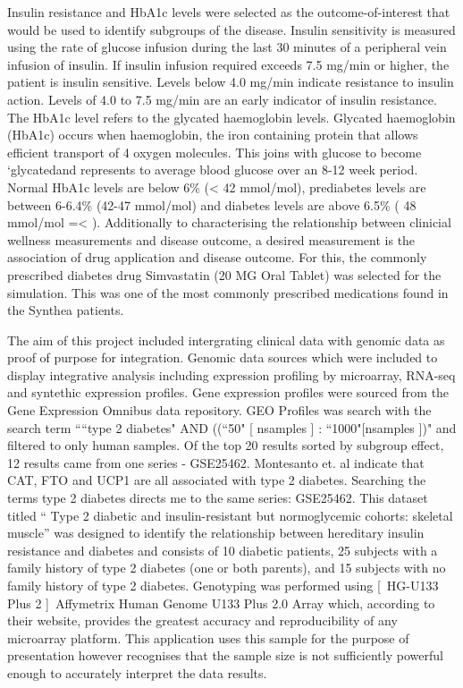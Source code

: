 \documentclass{bioinfo}
\begin{document}
\begin{methods}
Insulin resistance and HbA1c levels were selected as the outcome-of-interest that would be used to identify subgroups of the disease. Insulin sensitivity is measured using the rate of glucose infusion during the last 30 minutes of a peripheral vein infusion of insulin. If insulin infusion required exceeds 7.5 mg/min or higher, the patient is insulin sensitive. Levels below 4.0 mg/min indicate resistance to insulin action. Levels of 4.0 to 7.5 mg/min are an early indicator of insulin resistance. The HbA1c level refers to the glycated haemoglobin levels. Glycated haemoglobin (HbA1c) occurs when haemoglobin, the iron containing protein that allows efficient transport of 4 oxygen molecules. This joins with glucose to become ‘glycated\textquotesingle and represents to average blood glucose over an 8-12 week period. Normal HbA1c levels are below 6\% (< 42 mmol/mol), prediabetes levels are between 6-6.4\% (42-47 mmol/mol) and diabetes levels are above 6.5\% ( 48 mmol/mol =< ). Additionally to characterising the relationship between clinicial wellness measurements and disease outcome, a desired measurement is the association of drug application and disease outcome. For this, the commonly prescribed diabetes drug Simvastatin (20 MG Oral Tablet) was selected for the simulation. This was one of the most commonly prescribed medications found in the Synthea patients.

The aim of this project included intergrating clinical data with genomic data as proof of purpose for integration. Genomic data sources which were included to display integrative analysis including expression profiling by microarray, RNA-seq and syntethic expression profiles. Gene expression profiles were sourced from the Gene Expression Omnibus data repository. GEO Profiles was search with the search term ````type 2 diabetes" AND ((``50" {[ n\textunderscore samples ]} : ``1000"{[}n\textunderscorec samples {]})"  and filtered to only human samples. Of the top 20 results sorted by subgroup effect, 12 results came from one series - GSE25462. Montesanto et. al indicate that CAT, FTO and UCP1 are all associated with type 2 diabetes. Searching the terms type 2 diabetes directs me to the same series: GSE25462. This dataset titled “ Type 2 diabetic and insulin-resistant but normoglycemic cohorts: skeletal muscle” was designed to identify the relationship between hereditary insulin resistance and diabetes and consists of 10 diabetic patients, 25 subjects with a family history of type 2 diabetes (one or both parents), and 15 subjects with no family history of type 2 diabetes. Genotyping was performed using [\ HG-U133 Plus 2 ]\ Affymetrix Human Genome U133 Plus 2.0 Array which, according to their website, provides the greatest accuracy and reproducibility of any microarray platform. This application uses this sample for the purpose of presentation however recognises that the sample size is not sufficiently powerful enough to accurately interpret the data results. 



\end{methods}
\end{document}
